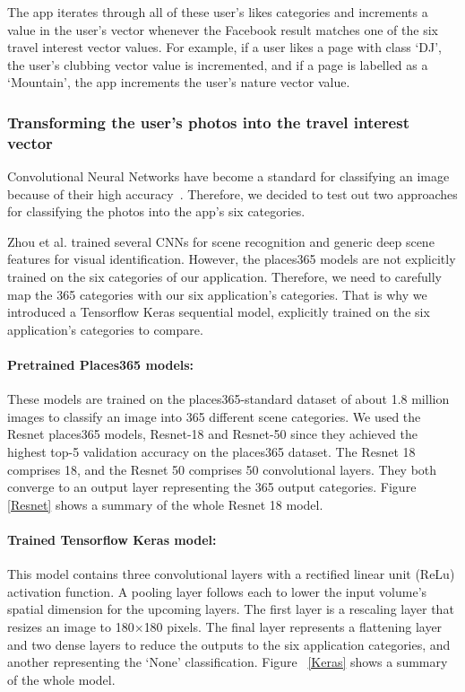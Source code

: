 The app iterates through
all of these user's likes categories and increments a value in the user's
vector whenever the Facebook result matches one of the six travel interest
vector values. For example, if a user likes a page with class `DJ', the user's
clubbing vector value is incremented, and if a page is labelled as a
`Mountain', the app increments the user's nature vector value.

\subsubsection{Transforming the user's photos into the travel interest vector}


Convolutional Neural Networks have become a standard
for classifying an image because of their high
accuracy~\cite{Zhou2018}. Therefore, we decided to test
out two approaches for classifying the photos into the
app's six categories. 

Zhou et al. \cite{Zhou2018} trained several CNNs for
scene recognition and generic deep scene features for
visual identification. However, the places365 models
are not explicitly trained on the six categories of
our application. Therefore, we need to carefully map
the 365 categories with our six application's
categories. That is why we introduced a Tensorflow
Keras sequential model, explicitly trained on the six
application's categories to compare.

\paragraph{Pretrained Places365 models:} These models
are trained on the places365-standard dataset of about
1.8 million images to classify an image into 365
different scene categories. We used the Resnet
places365 models, Resnet-18 and Resnet-50 since they
achieved the highest top-5 validation accuracy on the
places365 dataset. The Resnet 18 comprises 18, and the
Resnet 50 comprises 50 convolutional layers. They both
converge to an output layer representing the 365
output categories.  Figure \ref{Resnet} shows a
summary of the whole Resnet 18 model.

\paragraph{Trained Tensorflow Keras model: } This
model contains three convolutional layers with a
rectified linear unit (ReLu) activation function. A
pooling layer follows each to lower the input volume's
spatial dimension for the upcoming layers. The first
layer is a rescaling layer that resizes an image to
180$\times$180 pixels. The final layer represents a
flattening layer and two dense layers to reduce the
outputs to the six application categories, and another
representing the `None' classification. Figure
~\ref{Keras} shows a summary of the whole model.

